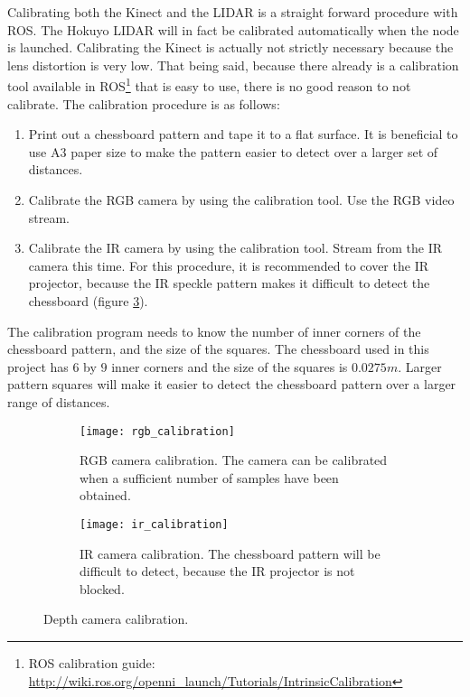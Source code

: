Calibrating both the Kinect and the \ac{LIDAR} is a straight forward procedure with \ac{ROS}. The Hokuyo \ac{LIDAR} will in fact be calibrated automatically when the node is launched. Calibrating the Kinect is actually not strictly necessary because the lens distortion is very low. That being said, because there already is a calibration tool available in \ac{ROS}\footnote{ROS calibration guide: \url{http://wiki.ros.org/openni_launch/Tutorials/IntrinsicCalibration}} that is easy to use, there is no good reason to not calibrate. The calibration procedure is as follows:

\begin{enumerate}
	\item Print out a chessboard pattern and tape it to a flat surface. It is beneficial to use A3 paper size to make the pattern easier to detect over a larger set of distances.
	\item Calibrate the RGB camera by using the calibration tool. Use the RGB video stream.
	\item Calibrate the IR camera by using the calibration tool. Stream from the IR camera this time. For this procedure, it is recommended to cover the IR projector, because the IR speckle pattern makes it difficult to detect the chessboard (figure \ref{fig:ir_calibration}).
\end{enumerate}

The calibration program needs to know the number of inner corners of the chessboard pattern, and the size of the squares. The chessboard used in this project has $6$ by $9$ inner corners and the size of the squares is $0.0275 m$. Larger pattern squares will make it easier to detect the chessboard pattern over a larger range of distances.

 \begin{figure}
 	\centering
 	\begin{subfigure}[b]{0.47\textwidth}
 		\texttt{[image: rgb\_calibration]}
 		\caption{RGB camera calibration. The camera can be calibrated when a sufficient number of samples have been obtained.}
 		\label{fig:rgb_calibration}
 	\end{subfigure}
 	\begin{subfigure}[b]{0.47\textwidth}
 		
 		\texttt{[image: ir\_calibration]}
 		\caption{IR camera calibration. The chessboard pattern will be difficult to detect, because the IR projector is not blocked.}
 		\label{fig:ir_calibration}
 	\end{subfigure}
 	\caption{Depth camera calibration.}
 \end{figure}

